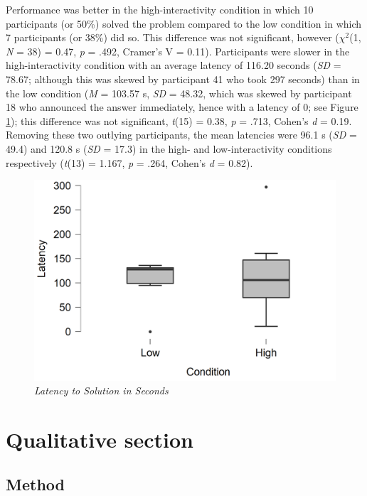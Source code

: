 \documentclass[twocolumn, issue, empirical, authordate,drafn]{jote-new-article}
\begin{document}
Performance was better in the high-interactivity condition in which 10 participants (or 50\%) solved the problem compared to the low condition in which 7 participants (or 38\%) did so. This difference was not significant, however ($\chi^2$(1, \emph{N} = 38) = 0.47, \emph{p} = .492, Cramer's V = 0.11). Participants were slower in the high-interactivity condition with an average latency of 116.20 seconds (\emph{SD} = 78.67; although this was skewed by participant 41 who took 297 seconds) than in the low condition (\emph{M} = 103.57 s, \emph{SD} = 48.32, which was skewed by participant 18 who announced the answer immediately, hence with a latency of 0; see Figure \ref{fig:figure2}); this difference was not significant, \emph{t}(15) = 0.38, \emph{p} = .713, Cohen's \emph{d} = 0.19. Removing these two outlying participants, the mean latencies were 96.1 s (\emph{SD} = 49.4) and 120.8 s (\emph{SD} = 17.3) in the high- and low-interactivity conditions respectively (\emph{t}(13) = 1.167, \emph{p} = .264, Cohen's \emph{d} = 0.82). 


\begin{figure}[t]
\includegraphics[width=\columnwidth]{media/image2.png}
\caption{\emph{Latency to Solution in Seconds} }
\label{fig:figure2}
\end{figure}




\section{Qualitative section}

\subsection{Method}
\end{document}
